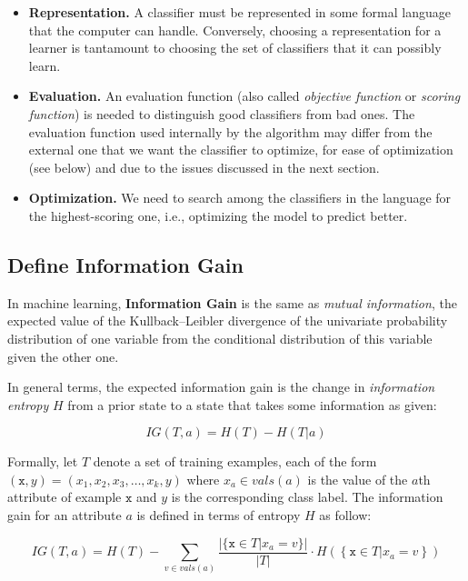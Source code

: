 \documentclass[12pt]{article}
\begin{document}
\begin{itemize}
    \item \textbf{Representation.} A classifier must be represented in some
        formal language that the computer can handle. Conversely, choosing a
        representation for a learner is tantamount to choosing the set of
        classifiers that it can possibly learn.

    \item \textbf{Evaluation.} An evaluation function (also called
        \emph{objective function} or \emph{scoring function}) is needed to
        distinguish good classifiers from bad ones. The evaluation function
        used internally by the algorithm may differ from the external one that
        we want the classifier to optimize, for ease of optimization (see
        below) and due to the issues discussed in the next section.

    \item \textbf{Optimization.} We need to search among the classifiers in the
        language for the highest-scoring one, i.e., optimizing the model to
        predict better.

\end{itemize}

\subsection{Define Information Gain}

In machine learning, \textbf{Information Gain} is the same as \emph{mutual
information}, the expected value of the Kullback–Leibler divergence of the
univariate probability distribution of one variable from the conditional
distribution of this variable given the other one.

In general terms, the expected information gain is the change in
\emph{information entropy} $H$ from a prior state to a state that takes some
information as given:

\begin{equation}
    IG(T,a)=H(T) - H(T | a)
\end{equation}

Formally, let $T$ denote a set of training examples, each of the form
$(\mathtt{x},y)=(x_1,x_2,x_3,\ldots,x_k,y)$ where $x_a \in vals(a)$ is the
value of the $a$th attribute of example $\mathtt{x}$ and $y$ is the
corresponding class label. The information gain for an attribute $a$ is defined
in terms of entropy $H$ as follow:

\begin{equation}
    IG(T,a)=H(T)-\sum_{v \in vals(a)} \frac{|\{\mathtt{x}\in T |
    x_a=v\}|}{|T|}\cdot H\left(\left\{\mathtt{x}\in T | x_a=v\right\}\right)
\end{equation}
\end{document}
